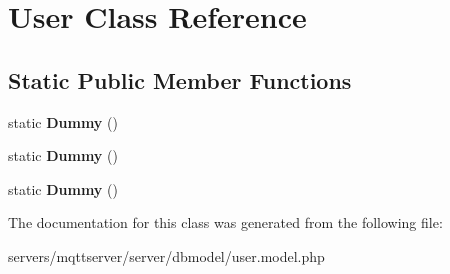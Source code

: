 \section{User Class Reference}
\label{class_lora_1_1_user}
\subsection*{Static Public Member Functions}
\begin{DoxyCompactItemize}
\item 
\mbox{\label{class_lora_1_1_user_a5fa82974fde7d3972f903d82e511ee8e}} 
static {\bfseries Dummy} ()
\item 
\mbox{\label{class_lora_1_1_user_a5fa82974fde7d3972f903d82e511ee8e}} 
static {\bfseries Dummy} ()
\item 
\mbox{\label{class_lora_1_1_user_a5fa82974fde7d3972f903d82e511ee8e}} 
static {\bfseries Dummy} ()
\end{DoxyCompactItemize}


The documentation for this class was generated from the following file\+:\begin{DoxyCompactItemize}
\item 
servers/mqttserver/server/dbmodel/user.\+model.\+php\end{DoxyCompactItemize}
